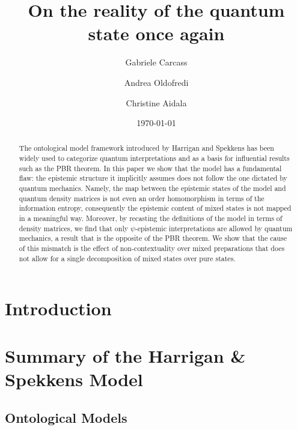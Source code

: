 \documentclass[twocolumn,prl,floatfix,superscriptaddress]{revtex4-2}
\begin{document}
\title{On the reality of the quantum state once again}
\author{Gabriele Carcass}
\author{Andrea Oldofredi}
\author{Christine Aidala}
\vspace{2mm}

\date{\today}


\begin{abstract}
The ontological model framework introduced by Harrigan and Spekkens has been widely used to categorize quantum interpretations and as a basis for influential results such as the PBR theorem. In this paper we show that the model has a fundamental flaw: the epistemic structure it implicitly assumes does not follow the one dictated by quantum mechanics. Namely, the map between the epistemic states of the model and quantum density matrices is not even an order homomorphism in terms of the information entropy, consequently the epistemic content of mixed states is not mapped in a meaningful way. Moreover, by recasting the definitions of the model in terms of density matrices, we find that only $\psi$-epistemic interpretations are allowed by quantum mechanics, a result that is the opposite of the PBR theorem. We show that the cause of this mismatch is the effect of non-contextuality over mixed preparations that does not allow for a single decomposition of mixed states over pure states.
\end{abstract}

\maketitle

\section{Introduction}



\section{Summary of the Harrigan \& Spekkens Model}

\subsection{Ontological Models}
\end{document}
